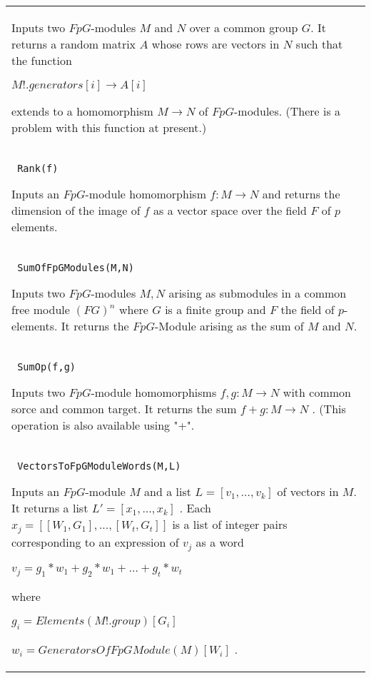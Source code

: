 \documentclass[a4paper,11pt]{report}
\begin{document}
{\begin{center}
\begin{tabular}{|l|}
 Inputs two $FpG$-modules $M$ and $N$ over a common group $G$. It returns a random matrix $A$ whose rows are vectors in $N$ such that the function 

 $ M!.generators[i] \longrightarrow A[i]$ 

 extends to a homomorphism $M \longrightarrow N$ of $FpG$-modules. (There is a problem with this function at present.) \\
 \index{Rank} \texttt{ Rank(f) } 

 Inputs an $FpG$-module homomorphism $f:M \longrightarrow N$ and returns the dimension of the image of $f$ as a vector space over the field $F$ of $p$ elements. \\
 \index{SumOfFpGModules} \texttt{ SumOfFpGModules(M,N) } 

 Inputs two $FpG$-modules $M, N$ arising as submodules in a common free module $(FG)^n$ where $G$ is a finite group and $F$ the field of $p$-elements. It returns the $FpG$-Module arising as the sum of $M$ and $N$. \\
 \index{SumOp} \texttt{ SumOp(f,g) } 

 Inputs two $FpG$-module homomorphisms $f,g:M \longrightarrow N$ with common sorce and common target. It returns the sum $f+g:M \longrightarrow N$ . (This operation is also available using "+". \\
 \index{VectorsToFpGModuleWords} \texttt{ VectorsToFpGModuleWords(M,L) } 

 Inputs an $FpG$-module $M$ and a list $L=[v_1,\ldots ,v_k]$ of vectors in $M$. It returns a list $L'= [x_1,...,x_k]$ . Each $x_j=[[W_1,G_1],...,[W_t,G_t]]$ is a list of integer pairs corresponding to an expression of $v_j$ as a word 

 $ v_j = g_1*w_1 + g_2*w_1 + ... + g_t*w_t $ 

 where 

 $g_i=Elements(M!.group)[G_i]$ 

 $w_i=GeneratorsOfFpGModule(M)[W_i]$ . \\
\end{tabular}\\[2mm]
\end{center}

 }

 
\end{document}
